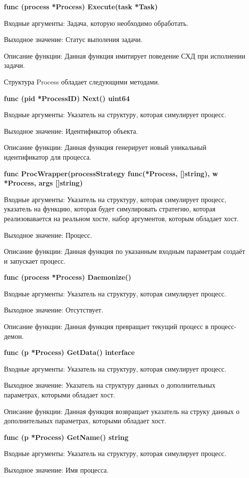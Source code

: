 \textbf{	func (process *Process) Execute(task *Task) }

Входные аргументы: Задача, которую необходимо обработать.

Выходное значение: Статус выполения задачи.

Описание функции: Данная функция имитирует поведение СХД при исполнении задачи.


Структура Process обладает следующими методами.

\textbf{func (pid *ProcessID) Next() uint64}

Входные аргументы: Указатель на структуру, которая симулирует процесс.

Выходное значение: Идентификатор объекта.

Описание функции: Данная функция генерирует новый уникальный идентификатор для процесса.

\textbf{func ProcWrapper(processStrategy func(*Process, []string), w *Process, args []string)}

Входные аргументы: Указатель на структуру, которая симулирует процесс, указатель на функцию, которая будет симулировать стратегию, которая реализовавается на реальном хосте, набор аргументов, которым обладает хост.

Выходное значение: Процесс.

Описание функции: Данная функция по указанным входным параметрам создаёт и запускает процесс.


\textbf{func (process *Process) Daemonize() }

Входные аргументы: Указатель на структуру, которая симулирует процесс.

Выходное значение: Отсутствует.

Описание функции: Данная функция превращает текущий процесс в процесс-демон.


\textbf{func (p *Process) GetData() interface}

Входные аргументы: Указатель на структуру, которая симулирует процесс.

Выходное значение: Указатель на структуру данных о дополнительных параметрах, которыми обладает хост.

Описание функции: Данная функция возвращает указатель на струку данных о дополнительных параметрах, которыми обладает хост.


\textbf{func (p *Process) GetName() string}

Входные аргументы: Указатель на структуру, которая симулирует процесс.

Выходное значение: Имя процесса.

